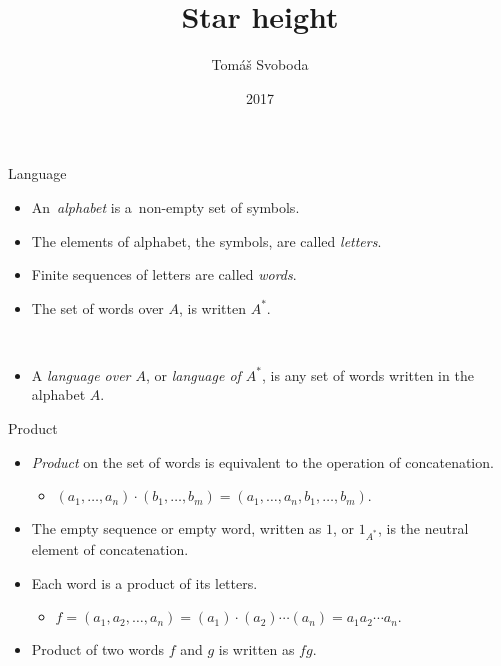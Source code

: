 \documentclass{beamer}
\title[Star height]{Star height}
\author[Tomáš Svoboda]{Tomáš Svoboda}
\institute{Department of Algebra}
\date{2017}
\begin{document}

\begin{frame}
\titlepage
\end{frame}

\begin{frame}{Language}
      \begin{itemize}
            \item An~\emph{alphabet} is a~non-empty set of symbols.
            \item The elements of alphabet, the symbols, are called \emph{letters}.
            \item Finite sequences of letters are called \emph{words}.
            \item The set of words over $A$, is written $A^*$.
      \end{itemize}

      ~
      \pause

      \begin{itemize}
            \item A \emph{language over $A$}, or \emph{language of $A^*$}, is any set of words written in the alphabet $A$.
      \end{itemize}
\end{frame}

\begin{frame}{Product}
      \begin{itemize}
            \item \emph{Product} on the set of words is equivalent to the operation of concatenation.
            \begin{itemize}
                  \item $(a_1, \dotsc, a_n) \cdot (b_1, \dotsc, b_m) = (a_1, \dotsc, a_n, b_1, \dotsc, b_m).$
            \end{itemize}
            \pause
            \item The empty sequence or empty word, written as $1$, or $1_{A^*}$, is the neutral element of concatenation.
            \pause
            \item Each word is a product of its letters.
            \begin{itemize}
                  \item $f = (a_1, a_2, \dotsc, a_n) = (a_1) \cdot (a_2) \dotsm (a_n) = a_1 a_2 \dotsm a_n.$
            \end{itemize}
            \pause
            \item Product of two words $f$ and $g$ is written as $fg$.
      \end{itemize}
\end{frame}
\end{document}
